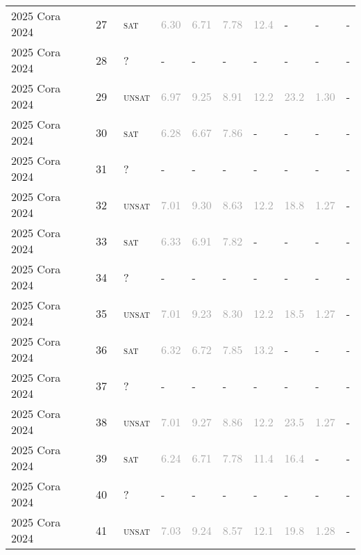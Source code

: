 \begin{center}
{\begin{longtable}{@{}llllllllll@{}}
2025 Cora 2024 & 27 & ~\textsc{sat} & \textcolor{darkgray}{6.30} & \textcolor{darkgray}{6.71} & \textcolor{darkgray}{7.78} & \textcolor{darkgray}{12.4} & - & - & - \\
2025 Cora 2024 & 28 & ~? & - & - & - & - & - & - & - \\
2025 Cora 2024 & 29 & ~\textsc{unsat} & \textcolor{darkgray}{6.97} & \textcolor{darkgray}{9.25} & \textcolor{darkgray}{8.91} & \textcolor{darkgray}{12.2} & \textcolor{darkgray}{23.2} & \textcolor{darkgray}{1.30} & - \\
2025 Cora 2024 & 30 & ~\textsc{sat} & \textcolor{darkgray}{6.28} & \textcolor{darkgray}{6.67} & \textcolor{darkgray}{7.86} & - & - & - & - \\
2025 Cora 2024 & 31 & ~? & - & - & - & - & - & - & - \\
2025 Cora 2024 & 32 & ~\textsc{unsat} & \textcolor{darkgray}{7.01} & \textcolor{darkgray}{9.30} & \textcolor{darkgray}{8.63} & \textcolor{darkgray}{12.2} & \textcolor{darkgray}{18.8} & \textcolor{darkgray}{1.27} & - \\
2025 Cora 2024 & 33 & ~\textsc{sat} & \textcolor{darkgray}{6.33} & \textcolor{darkgray}{6.91} & \textcolor{darkgray}{7.82} & - & - & - & - \\
2025 Cora 2024 & 34 & ~? & - & - & - & - & - & - & - \\
2025 Cora 2024 & 35 & ~\textsc{unsat} & \textcolor{darkgray}{7.01} & \textcolor{darkgray}{9.23} & \textcolor{darkgray}{8.30} & \textcolor{darkgray}{12.2} & \textcolor{darkgray}{18.5} & \textcolor{darkgray}{1.27} & - \\
2025 Cora 2024 & 36 & ~\textsc{sat} & \textcolor{darkgray}{6.32} & \textcolor{darkgray}{6.72} & \textcolor{darkgray}{7.85} & \textcolor{darkgray}{13.2} & - & - & - \\
2025 Cora 2024 & 37 & ~? & - & - & - & - & - & - & - \\
2025 Cora 2024 & 38 & ~\textsc{unsat} & \textcolor{darkgray}{7.01} & \textcolor{darkgray}{9.27} & \textcolor{darkgray}{8.86} & \textcolor{darkgray}{12.2} & \textcolor{darkgray}{23.5} & \textcolor{darkgray}{1.27} & - \\
2025 Cora 2024 & 39 & ~\textsc{sat} & \textcolor{darkgray}{6.24} & \textcolor{darkgray}{6.71} & \textcolor{darkgray}{7.78} & \textcolor{darkgray}{11.4} & \textcolor{darkgray}{16.4} & - & - \\
2025 Cora 2024 & 40 & ~? & - & - & - & - & - & - & - \\
2025 Cora 2024 & 41 & ~\textsc{unsat} & \textcolor{darkgray}{7.03} & \textcolor{darkgray}{9.24} & \textcolor{darkgray}{8.57} & \textcolor{darkgray}{12.1} & \textcolor{darkgray}{19.8} & \textcolor{darkgray}{1.28} & - \\

\end{longtable}}
\end{center}
